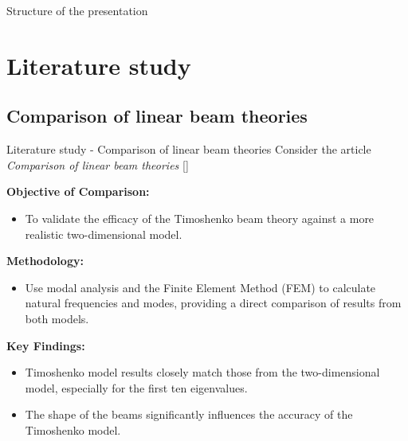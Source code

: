 \documentclass[8pt]{beamer}
\begin{document}
    \begin{frame}{Structure of the presentation}
        \tableofcontents
    \end{frame}

\section{Literature study}
    \subsection{Comparison of linear beam theories}
        \begin{frame}{Literature study - Comparison of linear beam theories}
            Consider the article \textit{Comparison of linear beam theories} [\cite{LVV09}]
            
            \textbf{Objective of Comparison:}
            \begin{itemize}
              \item To validate the efficacy of the Timoshenko beam theory against a more realistic two-dimensional model.
            \end{itemize}
            
            \textbf{Methodology:}
            \begin{itemize}
              \item Use modal analysis and the Finite Element Method (FEM) to calculate natural frequencies and modes, providing a direct comparison of results from both models.
            \end{itemize}
            
            \textbf{Key Findings:}
            \begin{itemize}
              \item Timoshenko model results closely match those from the two-dimensional model, especially for the first ten eigenvalues.
              \item The shape of the beams significantly influences the accuracy of the Timoshenko model.
            \end{itemize}

        \end{frame}
            
\end{document}
